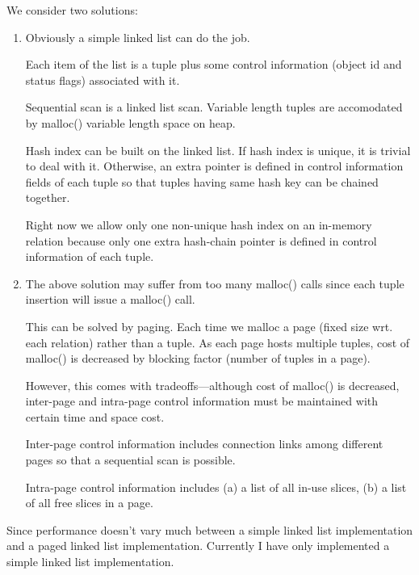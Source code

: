 \documentclass[11pt]{article}
\begin{document}
We consider two solutions:
\begin{enumerate}
\item Obviously a simple linked list can do the job.

      Each item of the list is a tuple plus some control information
      (object id and status flags) associated with it.

      Sequential scan is a linked list scan.  Variable length tuples
      are accomodated by malloc() variable length space on heap.

      Hash index can be built on the linked list.  If hash index is
      unique, it is trivial to deal with it.  Otherwise, an extra
      pointer is defined in control information fields of each tuple
      so that tuples having same hash key can be chained together.

      Right now we allow only one non-unique hash index on an
      in-memory relation because only one extra hash-chain pointer is
      defined in control information of each tuple.
\item The above solution may suffer from too many malloc() calls since
      each tuple insertion will issue a malloc() call.

      This can be solved by paging.  Each time we malloc a page (fixed
      size wrt. each relation) rather than a tuple.  As each page
      hosts multiple tuples, cost of malloc() is decreased by blocking
      factor (number of tuples in a page).

      However, this comes with tradeoffs---although cost of malloc()
      is decreased, inter-page and intra-page control information must
      be maintained with certain time and space cost.

      Inter-page control information includes connection links among
      different pages so that a sequential scan is possible.

      Intra-page control information includes (a) a list of all in-use
      slices, (b) a list of all free slices in a page.
\end{enumerate}

Since performance doesn't vary much between a simple linked list
implementation and a paged linked list implementation.  Currently I
have only implemented a simple linked list implementation.
\end{document}
